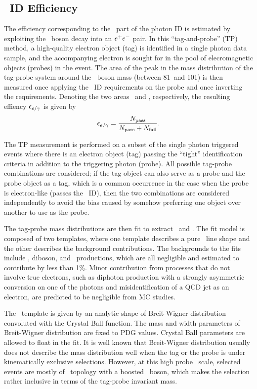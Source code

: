 \subsection{\egamma\ ID Efficiency}
\label{sec:idsf}

The efficiency corresponding to the \egamma\ part of the photon ID is estimated by exploiting the \PZ\ boson decay into an ${e}^{+}{e}^{-}$ pair. 
In this ``tag-and-probe'' (TP) method, a high-quality electron object (tag) is identified in a single photon data sample, and the accompanying electron is sought for in the pool of elecromagnetic objects (probes) in the event. 
The area of the peak in the mass distribution of the tag-probe system around the \PZ\ boson mass (between 81\GeV\ and 101\GeV) is then measured once applying the \Pe\Pgg\ ID requirements on the probe and once inverting the requirements. 
Denoting the two areas \npass\ and \nfail, respectively, the resulting effiency $\epsilon_{{e}/\gamma}$ is given by
\begin{equation}
\epsilon_{{e}/\gamma} = \frac{N_{\text{pass}}}{N_{\text{pass}} + N_{\text{fail}}}.
\end{equation}

The TP measurement is performed on a subset of the single photon triggered events where there is an electron object (tag) passing the ``tight'' identification criteria in addition to the triggering photon (probe). 
All possible tag-probe combinations are considered; if the tag object can also serve as a probe and the probe object as a tag, which is a common occurrence in the case when the probe is electron-like (passes the \Pe\Pgg\ ID), then the two combinations are considered independently to avoid the bias caused by somehow preferring one object over another to use as the probe.

The tag-probe mass distributions are then fit to extract \npass\ and \nfail. 
The fit model is composed of two templates, where one template describes a pure \Zee\ line shape and the other describes the background contributions. 
The backgrounds to the fits include \wj, diboson, and \ttbar\ productions, which are all negligible and estimated to contribute by less than 1\%. 
Minor contribution from processes that do not involve true electrons, such as diphoton production with a strongly asymmetric conversion on one of the photons and misidentification of a QCD jet as an electron, are predicted to be negligible from MC studies.
 
The \Zee\ template is given by an analytic shape of Breit-Wigner distribution convoluted with the Crystal Ball function. 
The mass and width parameters of Breit-Wigner distribution are fixed to PDG values. 
Crystal Ball parameters are allowed to float in the fit. 
It is well known that Breit-Wigner distribution usually does not describe the mass distribution well when the tag or the probe is under kinematically exclusive selections. 
However, at this high probe \pt\ scale, selected events are mostly of \zj\ topology with a boosted \PZ\ boson, which makes the selection rather inclusive in terms of the tag-probe invariant mass.

